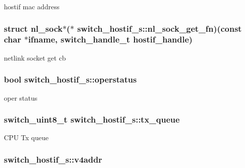hostif mac address \hypertarget{structswitch__hostif__s_a09a5dead93b027e3583d78bc0ba1a80d}{
\subsubsection[{nl\+\_\+sock\+\_\+get\+\_\+fn}]{\setlength{\rightskip}{0pt plus 5cm}struct nl\+\_\+sock$\ast$($\ast$ switch\+\_\+hostif\+\_\+s\+::nl\+\_\+sock\+\_\+get\+\_\+fn)(const char $\ast$ifname, switch\+\_\+handle\+\_\+t hostif\+\_\+handle)}}\label{structswitch__hostif__s_a09a5dead93b027e3583d78bc0ba1a80d}
netlink socket get cb \hypertarget{structswitch__hostif__s_afabebfb4866c63154390d1dbedca20db}{
\subsubsection[{operstatus}]{\setlength{\rightskip}{0pt plus 5cm}bool switch\+\_\+hostif\+\_\+s\+::operstatus}}\label{structswitch__hostif__s_afabebfb4866c63154390d1dbedca20db}
oper status \hypertarget{structswitch__hostif__s_ae8f584528b5189e3770c8788868bc585}{
\subsubsection[{tx\+\_\+queue}]{\setlength{\rightskip}{0pt plus 5cm}switch\+\_\+uint8\+\_\+t switch\+\_\+hostif\+\_\+s\+::tx\+\_\+queue}}\label{structswitch__hostif__s_ae8f584528b5189e3770c8788868bc585}
C\+P\+U Tx queue \hypertarget{structswitch__hostif__s_a5eb00b5b5f6387f8552ca9a0dded1396}{
\subsubsection[{v4addr}]{ switch\+\_\+hostif\+\_\+s\+::v4addr}}\label{structswitch__hostif__s_a5eb00b5b5f6387f8552ca9a0dded1396}

